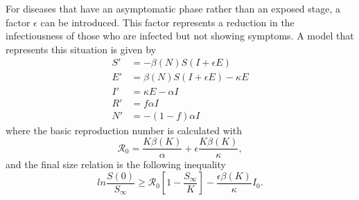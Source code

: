 For diseases that have an asymptomatic phase rather than an exposed stage, a factor $\epsilon$ can be introduced.
This factor represents a reduction in the infectiousness of those who are infected but not showing symptoms.
A model that represents this situation is given by \cite{brauerCompartmentalModelsEpidemiology2008}
\begin{equation}
    \begin{aligned}
        S' &= - \beta(N)S(I + \epsilon E) \\
        E' &= \beta(N)S(I + \epsilon E) - \kappa E \\
        I' &= \kappa E - \alpha I \\
        R' &= f \alpha I \\
        N' &= - (1 - f) \alpha I
    \end{aligned}
\end{equation}
where the basic reproduction number is calculated with
\begin{equation}
    \mathcal{R}_0 = \frac{K\beta(K)}{\alpha} + \epsilon\frac{K\beta(K)}{\kappa},
\end{equation}
and the final size relation is the following inequality
\begin{equation}
    ln \frac{S(0)}{S_\infty} \geq \mathcal{R}_0 \left[ 1 - \frac{S_\infty}{K} \right] - \frac{\epsilon\beta(K)}{\kappa}I_0.
\end{equation}